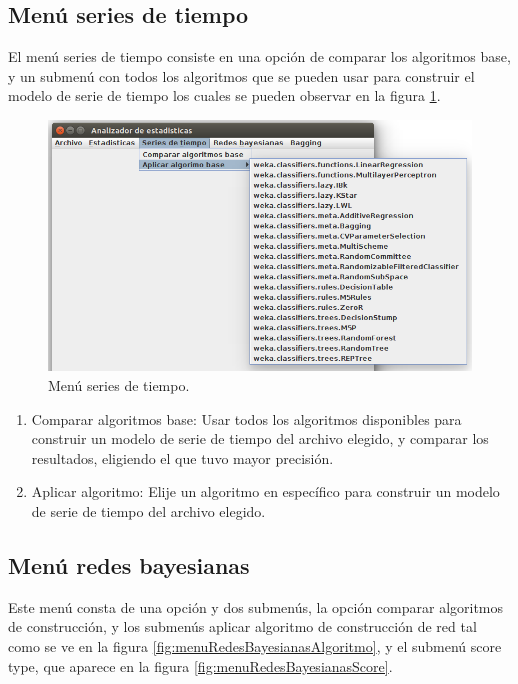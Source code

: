 \subsection{Menú series de tiempo}\label{subsec:menuSeriesDeTiempo}
El menú series de tiempo consiste en una opción de comparar los algoritmos base, y un submenú con todos los algoritmos que se pueden usar para construir el modelo de serie de tiempo los cuales se pueden observar en la figura \ref{fig:menuSeriesDeTiempo}.

\begin{figure}[h]%
	\centering
	\includegraphics[width=12cm]{img/menuSerieDeTiempo.png}
	\caption{Menú series de tiempo.}
	\label{fig:menuSeriesDeTiempo}
\end{figure}
\renewcommand{\labelenumi}{$\bullet$ }
\begin{enumerate}
	\item Comparar algoritmos base: Usar todos los algoritmos disponibles para construir un modelo de serie de tiempo del archivo elegido, y comparar los resultados, eligiendo el que tuvo mayor precisión.
	\item Aplicar algoritmo: Elije un algoritmo en específico para construir un modelo de serie de tiempo del archivo elegido.
\end{enumerate}

\subsection{Menú redes bayesianas} \label{subsec:menuRedesBayesianas}
Este menú consta de una opción y dos submenús, la opción comparar algoritmos de construcción, y los submenús aplicar algoritmo de construcción de red tal como se ve en la figura \ref{fig:menuRedesBayesianasAlgoritmo}, y el submenú score type, que aparece en la figura \ref{fig:menuRedesBayesianasScore}.

